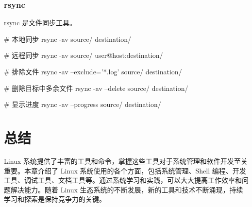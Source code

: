 \subsubsection{rsync}

rsync 是文件同步工具。


\begin{lstcode}[numbers=none]
  # 本地同步
  rsync -av source/ destination/

  # 远程同步
  rsync -av source/ user@host:destination/

  # 排除文件
  rsync -av --exclude='*.log' source/ destination/

  # 删除目标中多余文件
  rsync -av --delete source/ destination/

  # 显示进度
  rsync -av --progress source/ destination/
\end{lstcode}

\section{总结}

Linux 系统提供了丰富的工具和命令，掌握这些工具对于系统管理和软件开发至关重要。本章介绍了 Linux 系统使用的各个方面，包括系统管理、Shell 编程、开发工具、调试工具、文档工具等。通过系统学习和实践，可以大大提高工作效率和问题解决能力。随着 Linux 生态系统的不断发展，新的工具和技术不断涌现，持续学习和探索是保持竞争力的关键。
